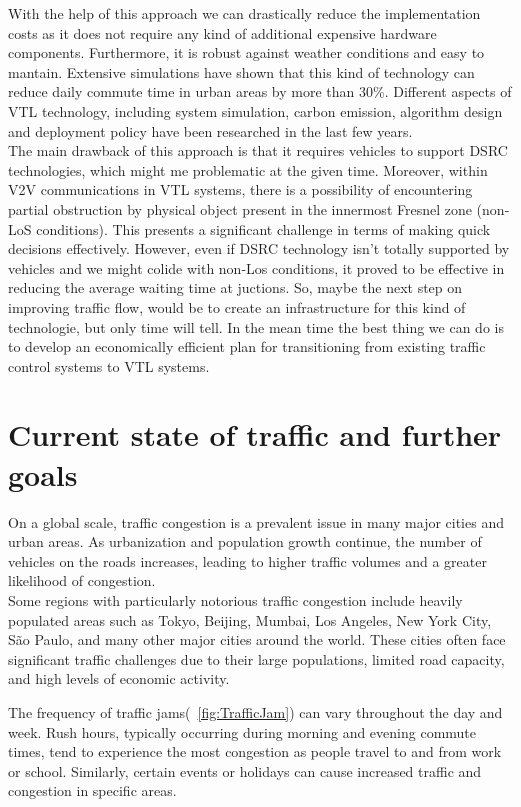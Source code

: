 \documentclass[17pt]{report}
\begin{document}
\indent \indent
With the help of this approach we can drastically reduce
the implementation costs as it does not require any kind of additional
expensive hardware components. Furthermore, it is robust against weather conditions
and easy to mantain. Extensive simulations have shown that this kind
of technology can reduce daily commute time in urban areas by more than 30\%.
Different aspects of VTL technology, including system simulation, carbon
emission, algorithm design and deployment policy have been researched in the
last few years. \cite{Neudecker2012}\\
\indent \indent
The main drawback of this approach is that it requires vehicles
to support DSRC technologies, which might me problematic at the given time.
Moreover, within V2V communications in VTL systems, there is a possibility of
encountering partial obstruction by physical object present in the innermost
Fresnel zone (non-LoS conditions). This presents a significant challenge in terms
of making quick decisions effectively. However, even if DSRC
technology isn't totally supported by vehicles and we might colide with non-Los
conditions, it proved to be effective in reducing the average waiting time at
juctions. So, maybe the next step on improving traffic flow, would be to create
an infrastructure for this kind of technologie, but only time will tell. In the mean
time the best thing we can do is to develop an economically efficient plan for
transitioning from existing traffic control systems to  VTL systems.

\pagebreak
\chapter{Current state of traffic and further goals}
\indent \indent
On a global scale, traffic congestion is a prevalent issue in many
major cities and urban areas. As urbanization and population growth
continue, the number of vehicles on the roads increases, leading to
higher traffic volumes and a greater likelihood of congestion.\\
\indent
Some regions with particularly notorious traffic congestion include
heavily populated areas such as Tokyo, Beijing, Mumbai, Los Angeles,
New York City, São Paulo, and many other major cities around the world.
These cities often face significant traffic challenges due to their large populations, limited road capacity, and high levels of economic activity.

The frequency of traffic jams(~\ref{fig:TrafficJam}) 
can vary throughout the day and week.
Rush hours, typically occurring during morning and evening commute
times, tend to experience the most congestion as people travel to
and from work or school. Similarly, certain events or holidays can
cause increased traffic and congestion in specific areas.
\end{document}

